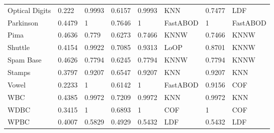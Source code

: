 \begin{table}[]
\begin{tabular}{@{}llllllll@{}}
\multicolumn{1}{l|}{Optical Digits}        &   0.222  &   0.9993  & \multicolumn{1}{l|}{0.6157}    &     0.9993     & \multicolumn{1}{l|}{KNN}         &            0.7477        &     LDF               \\
\multicolumn{1}{l|}{Parkinson}        &  0.4479   &   1  & \multicolumn{1}{l|}{0.7646}    &     1     & \multicolumn{1}{l|}{FastABOD}         &         1           &          FastABOD          \\
\multicolumn{1}{l|}{Pima}        &   0.4636   &   0.779  & \multicolumn{1}{l|}{ 0.6273}    &     0.7466     & \multicolumn{1}{l|}{KNNW}         &         0.7466           &     KNNW               \\
\multicolumn{1}{l|}{Shuttle}        &   0.4154  &   0.9922  & \multicolumn{1}{l|}{0.7085}    &     0.9313     & \multicolumn{1}{l|}{LoOP}         &        0.8701            &     KNNW               \\
\multicolumn{1}{l|}{Spam Base}        &  0.4626   &  0.7794  & \multicolumn{1}{l|}{0.6245}    &   0.7794       & \multicolumn{1}{l|}{KNNW}         &         0.7794           &        KNNW            \\
\multicolumn{1}{l|}{Stamps}        &  0.3797   &   0.9207  & \multicolumn{1}{l|}{0.6547}    &   0.9207       & \multicolumn{1}{l|}{KNN}         &         0.9207           &        KNN            \\
\multicolumn{1}{l|}{Vowel}        &  0.2233   &   1  & \multicolumn{1}{l|}{0.6142}    &       1   & \multicolumn{1}{l|}{FastABOD}         &            0.9156        &               COF     \\
\multicolumn{1}{l|}{WBC}        &   0.4385  &   0.9972  & \multicolumn{1}{l|}{0.7209}    &   0.9972       & \multicolumn{1}{l|}{KNN}         &        0.9972            &      KNN              \\
\multicolumn{1}{l|}{WDBC}        &   0.3415  &   1  & \multicolumn{1}{l|}{0.6893}    &      1    & \multicolumn{1}{l|}{COF}         &          1          &       COF             \\
\multicolumn{1}{l|}{WPBC}        &   0.4007  &  0.5829   & \multicolumn{1}{l|}{0.4929}    &      0.5432    & \multicolumn{1}{l|}{LDF}         &            0.5432        &       LDF             \\ \bottomrule
\end{tabular}
\end{table}

\newpage


